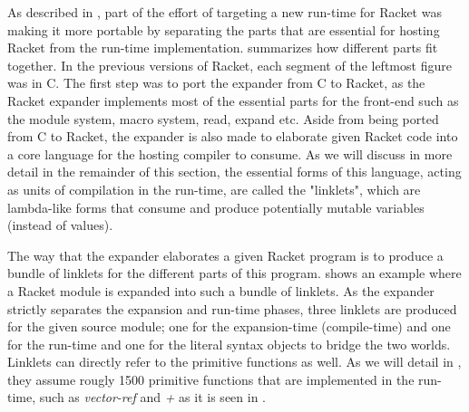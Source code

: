 \label{subsec:racket-expand}

As described in , part of the effort of targeting a
new run-time for Racket was making it more portable by separating the
parts that are essential for hosting Racket from the run-time
implementation.  summarizes how different
parts fit together. In the previous versions of Racket, each segment
of the leftmost figure was in C. The first step was to port the
expander from C to Racket, as the Racket expander implements most of
the essential parts for the front-end such as the module system, macro
system, read, expand etc. Aside from being ported from C to Racket,
the expander is also made to elaborate given Racket code into a core
language for the hosting compiler to consume. As we will discuss in
more detail in the remainder of this section, the essential forms of
this language, acting as units of compilation in the run-time, are
called the "linklets", which are lambda-like forms that consume and
produce potentially mutable variables (instead of values).

The way that the expander elaborates a given Racket program is to
produce a bundle of linklets for the different parts of this
program.  shows an example where a
Racket module is expanded into such a bundle of linklets. As the
expander strictly separates the expansion and run-time phases, three
linklets are produced for the given source module; one for the
expansion-time (compile-time) and one for the run-time and one for the
literal syntax objects to bridge the two worlds. Linklets can directly
refer to the primitive functions as well. As we will detail in
, they assume rougly 1500 primitive functions
that are implemented in the run-time, such as \emph{vector-ref} and
\emph{+} as it is seen in .

\vspace{-0.30cm}

